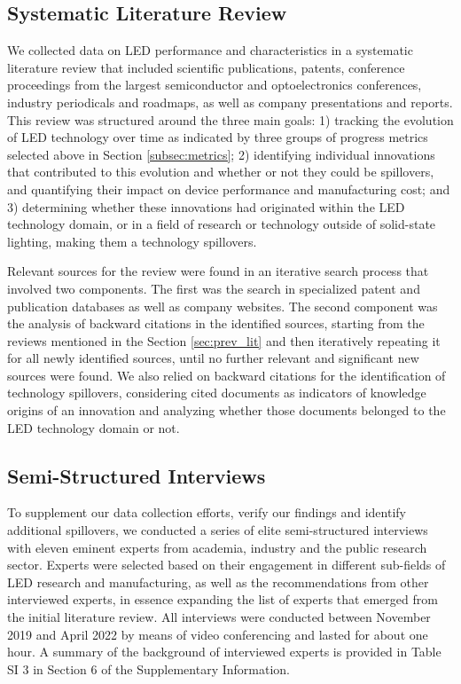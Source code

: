 \documentclass[journal=jacsat,manuscript=article]{achemso}
\begin{document}
\subsection{Systematic Literature Review}

We collected data on LED performance and characteristics in a systematic literature review that included scientific publications, patents, conference proceedings from the largest semiconductor and optoelectronics conferences, industry periodicals and roadmaps, as well as company presentations and reports. This review was structured around the three main goals: 1) tracking the evolution of LED technology over time as indicated by three groups of progress metrics selected above in Section \ref{subsec:metrics}; 2) identifying individual innovations that contributed to this evolution and whether or not they could be spillovers, and quantifying their impact on device performance and manufacturing cost; and 3) determining whether these innovations had originated within the LED technology domain, or in a field of research or technology outside of solid-state lighting, making them a technology spillovers. 

Relevant sources for the review were found in an iterative search process that involved two components. The first was the search in specialized patent and publication databases as well as company websites. The second component was the analysis of backward citations in the identified sources, starting from the reviews mentioned in the Section \ref{sec:prev_lit} and then iteratively repeating it for all newly identified sources, until no further relevant and significant new sources were found. We also relied on backward citations for the identification of technology spillovers, considering cited documents as indicators of knowledge origins of an innovation and analyzing whether those documents belonged to the LED technology domain or not.

\subsection{Semi-Structured Interviews}

To supplement our data collection efforts, verify our findings and identify additional spillovers, we conducted a series of elite semi-structured interviews with eleven eminent experts from academia, industry and the public research sector. Experts were selected based on their engagement in  different sub-fields of LED research and manufacturing, as well as the recommendations from other interviewed experts, in essence expanding the list of experts that emerged from the initial literature review. All interviews were conducted between November 2019 and April 2022 by means of video conferencing and lasted for about one hour. A summary of the background of interviewed experts is provided in Table SI 3 in Section 6 of the Supplementary Information.
\end{document}
